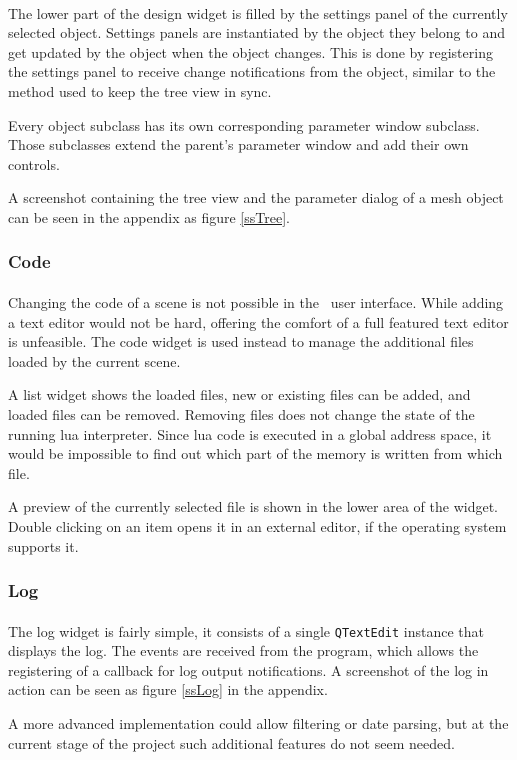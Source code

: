 \paragraph{}
The lower part of the design widget is filled by the settings panel of the currently selected object.
Settings panels are instantiated by the object they belong to and get updated by the object when the object changes.
This is done by registering the settings panel to receive change notifications from the object, similar to the method used to keep the tree view in sync.

Every object subclass has its own corresponding parameter window subclass.
Those subclasses extend the parent's parameter window and add their own controls.

A screenshot containing the tree view and the parameter dialog of a mesh object can be seen in the appendix as figure \ref{ssTree}.


\subsubsection{Code}
\paragraph{}
Changing the code of a scene is not possible in the \ER\ user interface.
While adding a text editor would not be hard, offering the comfort of a full featured text editor is unfeasible.
The code widget is used instead to manage the additional files loaded by the current scene.

A list widget shows the loaded files, new or existing files can be added, and loaded files can be removed.
Removing files does not change the state of the running lua interpreter.
Since lua code is executed in a global address space, it would be impossible to find out which part of the memory is written from which file.

A preview of the currently selected file is shown in the lower area of the widget.
Double clicking on an item opens it in an external editor, if the operating system supports it.


\subsubsection{Log}
\paragraph{}
The log widget is fairly simple, it consists of a single \lstinline{QTextEdit} instance that displays the log.
The events are received from the program, which allows the registering of a callback for log output notifications.
A screenshot of the log in action can be seen as figure \ref{ssLog} in the appendix.

A more advanced implementation could allow filtering or date parsing, but at the current stage of the project such additional features do not seem needed.

